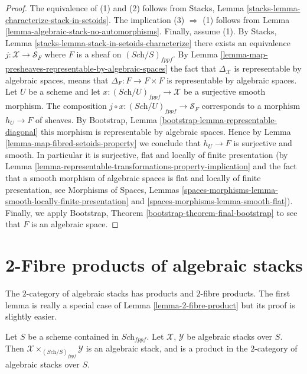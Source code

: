 \begin{proof}
The equivalence of (1) and (2) follows from
Stacks, Lemma \ref{stacks-lemma-characterize-stack-in-setoids}.
The implication (3) $\Rightarrow$ (1) follows from
Lemma \ref{lemma-algebraic-stack-no-automorphisms}.
Finally, assume (1). By
Stacks, Lemma \ref{stacks-lemma-stack-in-setoids-characterize}
there exists an equivalence $j : \mathcal{X} \to \mathcal{S}_F$
where $F$ is a sheaf on $(\textit{Sch}/S)_{fppf}$.  By
Lemma \ref{lemma-map-presheaves-representable-by-algebraic-spaces}
the fact that $\Delta_\mathcal{X}$ is representable by algebraic
spaces, means that $\Delta_F : F \to F \times F$
is representable by algebraic spaces.
Let $U$ be a scheme and let $x : (\textit{Sch}/U)_{fppf} \to \mathcal{X}$
be a surjective smooth morphism. The composition
$j \circ x : (\textit{Sch}/U)_{fppf} \to \mathcal{S}_F$
corresponds to a morphism $h_U \to F$ of sheaves. By
Bootstrap, Lemma \ref{bootstrap-lemma-representable-diagonal}
this morphism is representable by algebraic spaces.
Hence by
Lemma \ref{lemma-map-fibred-setoids-property}
we conclude that $h_U \to F$ is surjective and smooth.
In particular it is surjective, flat and locally of finite presentation
(by
Lemma \ref{lemma-representable-transformations-property-implication}
and the fact that a smooth morphism of algebraic spaces is flat and
locally of finite presentation, see
Morphisms of Spaces,
Lemmas \ref{spaces-morphisms-lemma-smooth-locally-finite-presentation} and
\ref{spaces-morphisms-lemma-smooth-flat}).
Finally, we apply
Bootstrap, Theorem \ref{bootstrap-theorem-final-bootstrap}
to see that $F$ is an algebraic space.
\end{proof}






\section{2-Fibre products of algebraic stacks}
\label{section-2-fibre-products}

\noindent
The $2$-category of algebraic stacks has products and $2$-fibre products.
The first lemma is really a special case of
Lemma \ref{lemma-2-fibre-product}
but its proof is slightly easier.

\begin{lemma}
\label{lemma-product-spaces}
Let $S$ be a scheme contained in $\textit{Sch}_{fppf}$.
Let $\mathcal{X}$, $\mathcal{Y}$ be algebraic stacks over $S$.
Then $\mathcal{X} \times_{(\textit{Sch}/S)_{fppf}} \mathcal{Y}$
is an algebraic stack, and is a product in the $2$-category of
algebraic stacks over $S$.
\end{lemma}

